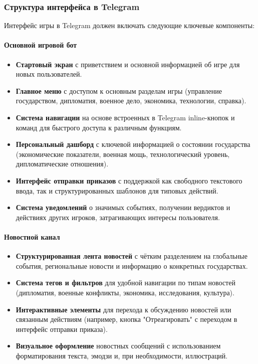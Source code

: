 \subsubsection{Структура интерфейса в Telegram}

Интерфейс игры в Telegram должен включать следующие ключевые компоненты:

\paragraph{Основной игровой бот}

\begin{itemize}
    \item \textbf{Стартовый экран} с приветствием и основной информацией об игре для новых пользователей.

    \item \textbf{Главное меню} с доступом к основным разделам игры (управление государством, дипломатия, военное дело, экономика, технологии, справка).

    \item \textbf{Система навигации} на основе встроенных в Telegram inline-кнопок и команд для быстрого доступа к различным функциям.

    \item \textbf{Персональный дашборд} с ключевой информацией о состоянии государства (экономические показатели, военная мощь, технологический уровень, дипломатические отношения).

    \item \textbf{Интерфейс отправки приказов} с поддержкой как свободного текстового ввода, так и структурированных шаблонов для типовых действий.

    \item \textbf{Система уведомлений} о значимых событиях, получении вердиктов и действиях других игроков, затрагивающих интересы пользователя.
\end{itemize}

\paragraph{Новостной канал}

\begin{itemize}
    \item \textbf{Структурированная лента новостей} с чётким разделением на глобальные события, региональные новости и информацию о конкретных государствах.

    \item \textbf{Система тегов и фильтров} для удобной навигации по типам новостей (дипломатия, военные конфликты, экономика, исследования, культура).

    \item \textbf{Интерактивные элементы} для перехода к обсуждению новостей или связанным действиям (например, кнопка "Отреагировать" с переходом в интерфейс отправки приказа).

    \item \textbf{Визуальное оформление} новостных сообщений с использованием форматирования текста, эмодзи и, при необходимости, иллюстраций.
\end{itemize}

